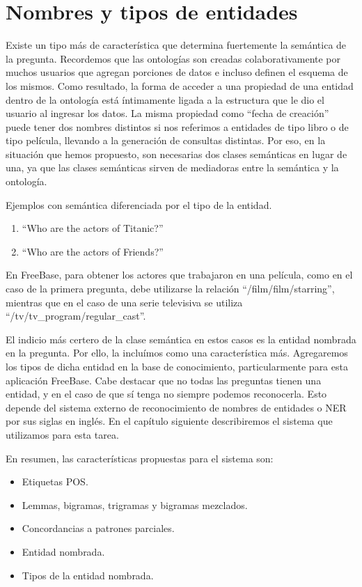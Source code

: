 
\section{Nombres y tipos de entidades}

Existe un tipo más de característica que determina fuertemente la semántica de la pregunta. Recordemos que las ontologías son creadas colaborativamente por muchos usuarios que agregan porciones de datos e incluso definen el esquema de los mismos. Como resultado, la forma de acceder a una propiedad de una entidad dentro de la ontología está íntimamente ligada a la estructura que le dio el usuario al ingresar los datos. La misma propiedad como ``fecha de creación'' puede tener dos nombres distintos si nos referimos a entidades de tipo libro o de tipo película, llevando a la generación de consultas distintas. Por eso, en la situación que hemos propuesto, son necesarias dos clases semánticas en lugar de una, ya que las clases semánticas sirven de mediadoras entre la semántica y la ontología.

\begin{example} Ejemplos con semántica diferenciada por el tipo de la entidad.
    \begin{enumerate}
        \item ``Who are the actors of Titanic?''
        \item ``Who are the actors of Friends?''
    \end{enumerate}
En FreeBase, para obtener los actores que trabajaron en una película, como en el caso de la primera pregunta, debe utilizarse la relación ``/film/film/starring'', mientras que en el caso de una serie televisiva se utiliza ``/tv/tv\_program/regular\_cast''.
\end{example}

El indicio más certero de la clase semántica en estos casos es la entidad nombrada en la pregunta. Por ello, la incluímos como una característica más. Agregaremos los tipos de dicha entidad en la base de conocimiento, particularmente para esta aplicación FreeBase. Cabe destacar que no todas las preguntas tienen una entidad, y en el caso de que sí tenga no siempre podemos reconocerla. Esto depende del sistema externo de reconocimiento de nombres de entidades o NER por sus siglas en inglés. En el capítulo siguiente describiremos el sistema que utilizamos para esta tarea.

En resumen, las características propuestas para el sistema son:
\begin{itemize}
    \item Etiquetas POS.
    \item Lemmas, bigramas, trigramas y bigramas mezclados.
    \item Concordancias a patrones parciales.
    \item Entidad nombrada.
    \item Tipos de la entidad nombrada.
\end{itemize}

